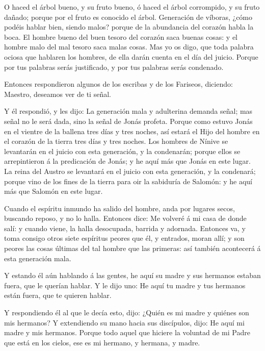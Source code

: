  O haced el árbol bueno, y su fruto bueno, ó haced el árbol
corrompido, y su fruto dañado; porque por el fruto es conocido el árbol.
 Generación de víboras, ¿cómo podéis hablar bien, siendo
malos? porque de la abundancia del corazón habla la boca. 
El hombre bueno del buen tesoro del corazón saca buenas cosas: y el
hombre malo del mal tesoro saca malas cosas.  Mas yo os
digo, que toda palabra ociosa que hablaren los hombres, de ella darán
cuenta en el día del juicio.  Porque por tus palabras serás
justificado, y por tus palabras serás condenado.

 Entonces respondieron algunos de los escribas y de los
Fariseos, diciendo: Maestro, deseamos ver de ti señal.

 Y él respondió, y les dijo: La generación mala y
adulterina demanda señal; mas señal no le será dada, sino la señal de
Jonás profeta.  Porque como estuvo Jonás en el vientre de
la ballena tres días y tres noches, así estará el Hijo del hombre en el
corazón de la tierra tres días y tres noches.  Los hombres
de Nínive se levantarán en el juicio con esta generación, y la
condenarán; porque ellos se arrepintieron á la predicación de Jonás; y
he aquí más que Jonás en este lugar.  La reina del Austro
se levantará en el juicio con esta generación, y la condenará; porque
vino de los fines de la tierra para oir la sabiduría de Salomón: y he
aquí más que Salomón en este lugar.

 Cuando el espíritu inmundo ha salido del hombre, anda por
lugares secos, buscando reposo, y no lo halla.  Entonces
dice: Me volveré á mi casa de donde salí: y cuando viene, la halla
desocupada, barrida y adornada.  Entonces va, y toma
consigo otros siete espíritus peores que él, y entrados, moran allí; y
son peores las cosas últimas del tal hombre que las primeras: así
también acontecerá á esta generación mala.

 Y estando él aún hablando á las gentes, he aquí su madre y
sus hermanos estaban fuera, que le querían hablar.  Y le
dijo uno: He aquí tu madre y tus hermanos están fuera, que te quieren
hablar.

 Y respondiendo él al que le decía esto, dijo: ¿Quién es mi
madre y quiénes son mis hermanos?  Y extendiendo su mano
hacia sus discípulos, dijo: He aquí mi madre y mis hermanos.
 Porque todo aquel que hiciere la voluntad de mi Padre que
está en los cielos, ese es mi hermano, y hermana, y madre.

